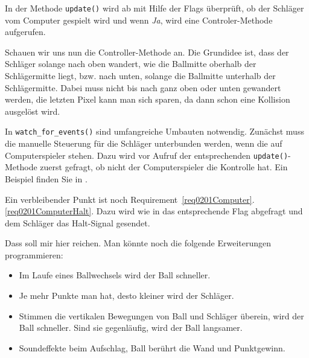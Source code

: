 In der Methode \texttt{update()} wird ab  mit Hilfe der Flags überprüft, ob der Schläger vom Computer gespielt wird und wenn \emph{Ja}, wird eine Controler-Methode aufgerufen.


Schauen wir uns nun die Controller-Methode an. Die Grundidee ist, dass der Schläger solange nach oben wandert, wie die Ballmitte oberhalb der Schlägermitte liegt, bzw. nach unten, solange die Ballmitte unterhalb der Schlägermitte. Dabei muss nicht bis nach ganz oben oder unten gewandert werden, die letzten Pixel kann man sich sparen, da dann schon eine Kollision ausgelöst wird.


In \texttt{watch\_for\_events()} sind umfangreiche Umbauten notwendig. Zunächst muss die manuelle Steuerung für die Schläger unterbunden werden, wenn die auf Computerspieler stehen. Dazu wird vor Aufruf der entsprechenden \texttt{update()}-Methode zuerst gefragt, ob nicht der Computerspieler die Kontrolle hat. Ein Beispiel finden Sie in .

Ein verbleibender Punkt ist noch Requirement~\ref{req0201Computer}.\ref{req0201ComputerHalt}. Dazu wird wie in  das entsprechende Flag abgefragt und dem Schläger das Halt-Signal gesendet.


Dass soll mir hier reichen. Man könnte noch die folgende Erweiterungen programmieren:

\begin{itemize}
	\item Im Laufe eines Ballwechsels wird der Ball schneller.
	\item Je mehr Punkte man hat, desto kleiner wird der Schläger.
	\item Stimmen die vertikalen Bewegungen von Ball und Schläger überein, wird der Ball schneller. Sind sie gegenläufig, wird der Ball langsamer.
    \item Soundeffekte beim Aufschlag, Ball berührt die Wand und Punktgewinn.
\end{itemize}